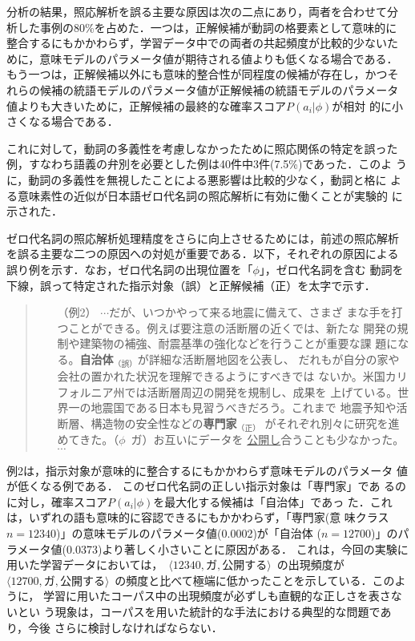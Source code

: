 分析の結果，照応解析を誤る主要な原因は次の二点にあり，両者を合わせて分
析した事例の80\%を占めた．一つは，正解候補が動詞の格要素として意味的に
整合するにもかかわらず，学習データ中での両者の共起頻度が比較的少ないた
めに，意味モデルのパラメータ値が期待される値よりも低くなる場合である．
もう一つは，正解候補以外にも意味的整合性が同程度の候補が存在し，かつそ
れらの候補の統語モデルのパラメータ値が正解候補の統語モデルのパラメータ
値よりも大きいために，正解候補の最終的な確率スコア$P(a_i|\phi)$が相対
的に小さくなる場合である．

これに対して，動詞の多義性を考慮しなかったために照応関係の特定を誤った
例，すなわち語義の弁別を必要とした例は40件中3件(7.5\%)であった．このよ
うに，動詞の多義性を無視したことによる悪影響は比較的少なく，動詞と格に
よる意味素性の近似が日本語ゼロ代名詞の照応解析に有効に働くことが実験的
に示された．

ゼロ代名詞の照応解析処理精度をさらに向上させるためには，前述の照応解析
を誤る主要な二つの原因への対処が重要である．以下，それぞれの原因による
誤り例を示す．なお，ゼロ代名詞の出現位置を「$\phi$」，ゼロ代名詞を含む
動詞を下線，誤って特定された指示対象（誤）と正解候補（正）を太字で示す．

\begin{flushleft}
  \begin{quote}
    \begin{itemize}
    \item [（例2）] $\cdots$だが、いつかやって来る地震に備えて、さまざ
      まな手を打つことができる。例えば要注意の活断層の近くでは、新たな
      開発の規制や建築物の補強、耐震基準の強化などを行うことが重要な課
      題になる。{\bf 自治体}$_{（誤）}$が詳細な活断層地図を公表し、
      だれもが自分の家や会社の置かれた状況を理解できるようにすべきでは
      ないか。米国カリフォルニア州では活断層周辺の開発を規制し、成果を
      上げている。世界一の地震国である日本も見習うべきだろう。これまで
      地震予知や活断層、構造物の安全性などの{\bf 専門家}$_{（正）}$
      がそれぞれ別々に研究を進めてきた。（$\phi$~ガ）お互いにデータを
      \underline{公開し}合うことも少なかった。$\cdots$
    \end{itemize}
  \end{quote}
\end{flushleft}

\noindent
例2は，指示対象が意味的に整合するにもかかわらず意味モデルのパラメータ
値が低くなる例である． このゼロ代名詞の正しい指示対象は「専門家」であ
るのに対し，確率スコア$P(a_i|\phi)$を最大化する候補は「自治体」であっ
た．これは，いずれの語も意味的に容認できるにもかかわらず，「専門家(意
味クラス$n=12340$)」の意味モデルのパラメータ値(0.0002)が「自治体
($n=12700$)」のパラメータ値(0.0373)より著しく小さいことに原因がある．
これは，今回の実験に用いた学習データにおいては，\mbox{~$\langle 12340,
  ガ,公開する\rangle$~}の出現頻度が\mbox{~$\langle 12700,ガ,公開する
  \rangle$~}の頻度と比べて極端に低かったことを示している．このように，
学習に用いたコーパス中の出現頻度が必ずしも直観的な正しさを表さないとい
う現象は，コーパスを用いた統計的な手法における典型的な問題であり，今後
さらに検討しなければならない．

